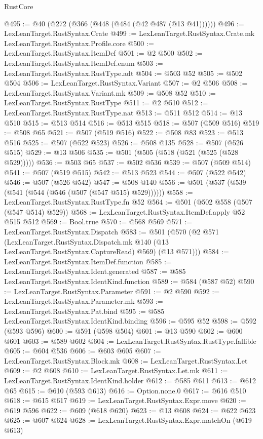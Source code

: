 \begin{lexlean}{RustCore}
\begin{coremodule}
@495 := @40 (@272 (@366 (@448 (@484 (@42 @487 (@13 @41))))))
@496 := LexLeanTarget.RustSyntax.Crate
@499 := LexLeanTarget.RustSyntax.Crate.mk LexLeanTarget.RustSyntax.Profile.core
@500 := LexLeanTarget.RustSyntax.ItemDef
@501 := @2 @500
@502 := LexLeanTarget.RustSyntax.ItemDef.enum
@503 := LexLeanTarget.RustSyntax.RustType.adt
@504 := @503 @52
@505 := @502 @504
@506 := LexLeanTarget.RustSyntax.Variant
@507 := @2 @506
@508 := LexLeanTarget.RustSyntax.Variant.mk
@509 := @508 @52
@510 := LexLeanTarget.RustSyntax.RustType
@511 := @2 @510
@512 := LexLeanTarget.RustSyntax.RustType.nat
@513 := @511 @512
@514 := @13 @510
@515 := @513 @514
@516 := @513 @515
@518 := @507 (@509 @516)
@519 := @508 @65
@521 := @507 (@519 @516)
@522 := @508 @83
@523 := @513 @516
@525 := @507 (@522 @523)
@526 := @508 @135
@528 := @507 (@526 @515)
@529 := @13 @506
@535 := @501 (@505 (@518 (@521 (@525 (@528 @529)))))
@536 := @503 @65
@537 := @502 @536
@539 := @507 (@509 @514)
@541 := @507 (@519 @515)
@542 := @513 @523
@544 := @507 (@522 @542)
@546 := @507 (@526 @542)
@547 := @508 @140
@556 := @501 (@537 (@539 (@541 (@544 (@546 (@507 (@547 @515) @529))))))
@558 := LexLeanTarget.RustSyntax.RustType.fn @52
@564 := @501 (@502 @558 (@507 (@547 @514) @529))
@568 := LexLeanTarget.RustSyntax.ItemDef.apply @52 @515 @512
@569 := Bool.true
@570 := @568 @569
@571 := LexLeanTarget.RustSyntax.Dispatch
@583 := @501
    (@570
      (@2
        @571
        (LexLeanTarget.RustSyntax.Dispatch.mk @140 (@13 LexLeanTarget.RustSyntax.CaptureRead) @569)
        (@13 @571)))
@584 := LexLeanTarget.RustSyntax.ItemDef.function
@585 := LexLeanTarget.RustSyntax.Ident.generated
@587 := @585 LexLeanTarget.RustSyntax.IdentKind.function
@589 := @584 (@587 @52)
@590 := LexLeanTarget.RustSyntax.Parameter
@591 := @2 @590
@592 := LexLeanTarget.RustSyntax.Parameter.mk
@593 := LexLeanTarget.RustSyntax.Pat.bind
@595 := @585 LexLeanTarget.RustSyntax.IdentKind.binding
@596 := @595 @52
@598 := @592 (@593 @596)
@600 := @591 (@598 @504)
@601 := @13 @590
@602 := @600 @601
@603 := @589 @602
@604 := LexLeanTarget.RustSyntax.RustType.fallible
@605 := @604 @536
@606 := @603 @605
@607 := LexLeanTarget.RustSyntax.Block.mk
@608 := LexLeanTarget.RustSyntax.Let
@609 := @2 @608
@610 := LexLeanTarget.RustSyntax.Let.mk
@611 := LexLeanTarget.RustSyntax.IdentKind.holder
@612 := @585 @611
@613 := @612 @65
@615 := @610 (@593 @613)
@616 := Option.none.{0}
@617 := @616 @510
@618 := @615 @617
@619 := LexLeanTarget.RustSyntax.Expr.move
@620 := @619 @596
@622 := @609 (@618 @620)
@623 := @13 @608
@624 := @622 @623
@625 := @607 @624
@628 := LexLeanTarget.RustSyntax.Expr.matchOn (@619 @613)

\end{coremodule}
\end{lexlean}
